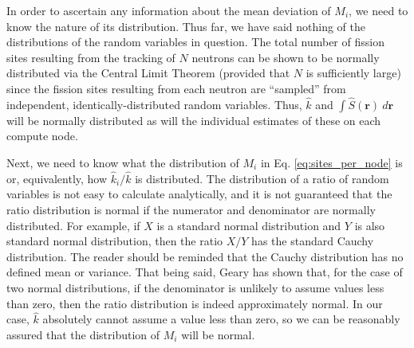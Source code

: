 In order to ascertain any information about the mean deviation of
$M_i$, we need to know the nature of its distribution. Thus far, we
have said nothing of the distributions of the random variables in
question. The total number of fission sites resulting from the
tracking of $N$ neutrons can be shown to be normally distributed via
the Central Limit Theorem (provided that $N$ is sufficiently large)
since the fission sites resulting from each neutron are ``sampled''
from independent, identically-distributed random variables. Thus,
$\hat{k}$ and $\int \hat{S} (\mathbf{r}) \: d\mathbf{r}$ will be
normally distributed as will the individual estimates of these on each
compute node.

Next, we need to know what the distribution of $M_i$ in
Eq. \ref{eq:sites_per_node} is or, equivalently, how $\hat{k}_i /
\hat{k}$ is distributed. The distribution of a ratio of random
variables is not easy to calculate analytically, and it is not
guaranteed that the ratio distribution is normal if the numerator and
denominator are normally distributed. For example, if $X$ is a
standard normal distribution and $Y$ is also standard normal
distribution, then the ratio $X/Y$ has the standard Cauchy
distribution. The reader should be reminded that the Cauchy
distribution has no defined mean or variance. That being said, Geary
\cite{geary} has shown that, for the case of two normal distributions,
if the denominator is unlikely to assume values less than zero, then
the ratio distribution is indeed approximately normal. In our case,
$\hat{k}$ absolutely cannot assume a value less than zero, so we can
be reasonably assured that the distribution of $M_i$ will be normal.


